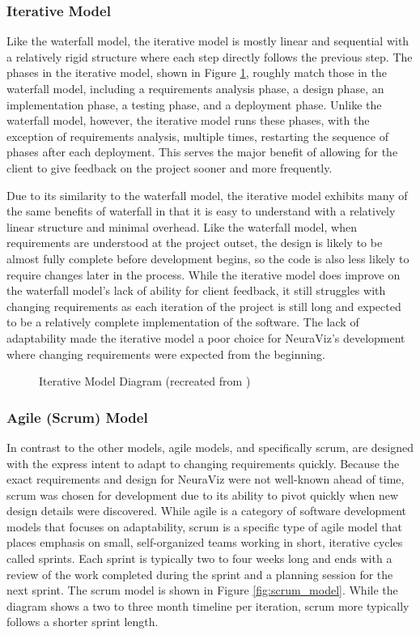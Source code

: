 \subsubsection{Iterative Model}
Like the waterfall model, the iterative model is mostly linear and sequential with a relatively rigid structure where each step directly follows the previous step. The phases in the iterative model, shown in Figure \ref{fig:iterative_model}, roughly match those in the waterfall model, including a requirements analysis phase, a design phase, an implementation phase, a testing phase, and a deployment phase. Unlike the waterfall model, however, the iterative model runs these phases, with the exception of requirements analysis, multiple times, restarting the sequence of phases after each deployment. This serves the major benefit of allowing for the client to give feedback on the project sooner and more frequently.

Due to its similarity to the waterfall model, the iterative model exhibits many of the same benefits of waterfall in that it is easy to understand with a relatively linear structure and minimal overhead. Like the waterfall model, when requirements are understood at the project outset, the design is likely to be almost fully complete before development begins, so the code is also less likely to require changes later in the process. While the iterative model does improve on the waterfall model's lack of ability for client feedback, it still struggles with changing requirements as each iteration of the project is still long and expected to be a relatively complete implementation of the software. The lack of adaptability made the iterative model a poor choice for NeuraViz's development where changing requirements were expected from the beginning.

\begin{figure}[htb]
    \centering
    
    \caption[Iterative Model Diagram]{Iterative Model Diagram (recreated from \cite{tutorialspointIterative})}
    \label{fig:iterative_model}
\end{figure}

\subsubsection{Agile (Scrum) Model}
In contrast to the other models, agile models, and specifically scrum, are designed with the express intent to adapt to changing requirements quickly. Because the exact requirements and design for NeuraViz were not well-known ahead of time, scrum was chosen for development due to its ability to pivot quickly when new design details were discovered. While agile is a category of software development models that focuses on adaptability, scrum is a specific type of agile model that places emphasis on small, self-organized teams working in short, iterative cycles called sprints. Each sprint is typically two to four weeks long and ends with a review of the work completed during the sprint and a planning session for the next sprint. The scrum model is shown in Figure \ref{fig:scrum_model}. While the diagram shows a two to three month timeline per iteration, scrum more typically follows a shorter sprint length.

